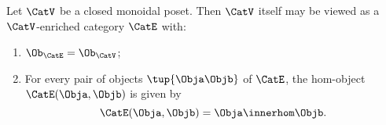 \begin{lemma}
Let $\CatV$ be a closed monoidal poset. Then $\CatV$ itself may be viewed as a $\CatV$-enriched category $\CatE$ with:
\begin{enumerate}
\item $\Ob_\CatE = \Ob_\CatV$;
\item For every pair of objects $\tup{\Obja \Objb}$ of $\CatE$, the hom-object $\CatE(\Obja, \Objb)$ is given by 
\begin{equation}
\CatE(\Obja, \Objb) = \Obja \innerhom \Objb.
\end{equation}

\end{enumerate}


\end{lemma}

